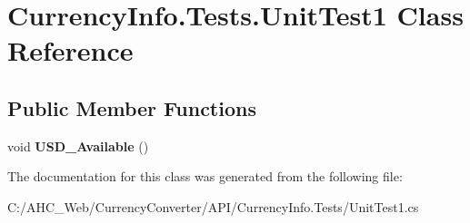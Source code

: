 \hypertarget{class_currency_info_1_1_tests_1_1_unit_test1}{\section{Currency\-Info.\-Tests.\-Unit\-Test1 Class Reference}
\label{class_currency_info_1_1_tests_1_1_unit_test1}
}
\subsection*{Public Member Functions}
\begin{DoxyCompactItemize}
\item 
\hypertarget{class_currency_info_1_1_tests_1_1_unit_test1_afe4b3ff29ae2a00c9688244d0f01b7c0}{void {\bfseries U\-S\-D\-\_\-\-Available} ()}\label{class_currency_info_1_1_tests_1_1_unit_test1_afe4b3ff29ae2a00c9688244d0f01b7c0}

\end{DoxyCompactItemize}


The documentation for this class was generated from the following file\-:\begin{DoxyCompactItemize}
\item 
C\-:/\-A\-H\-C\-\_\-\-Web/\-Currency\-Converter/\-A\-P\-I/\-Currency\-Info.\-Tests/Unit\-Test1.\-cs\end{DoxyCompactItemize}
